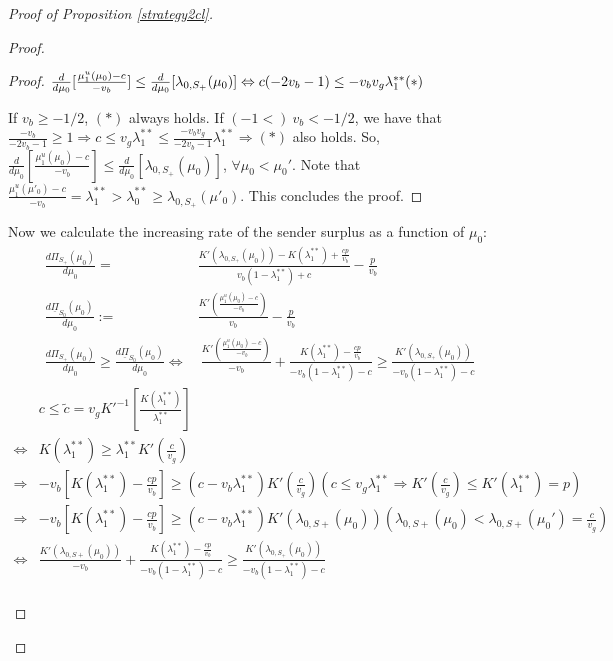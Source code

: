 \documentclass[11pt]{extarticle}
\newcommand{\lra}{\Leftrightarrow}
\newcommand{\ra}{\Rightarrow}
\begin{document}
\begin{proof}[Proof of Proposition \ref{strategy2cl}]
\begin{enumerate}[(1)]
\begin{proof}
\begin{enumerate}[i)]
\begin{proof}
					$\frac{d}{d \mu_0} [\frac{\mu_1^u(\mu_0)-c}{-v_b}] \leq \frac{d}{d \mu_0} [\lambda_{0,S_+}(\mu_0)] \lra c(-2v_b-1)\leq -v_b v_g\lambda_1^{**} \hfill (*)$
					
					If $v_b \geq -1/2$, $(*)$ always holds. If $(-1<) ~v_b < -1/2$, we have that $\frac{-v_b}{-2v_b-1} \geq 1 \ra c \leq v_g\lambda_1^{**}\leq \frac{-v_bv_g}{-2v_b-1}\lambda_1^{**} \ra (*)$ also holds. So, $\frac{d}{d \mu_0} [\frac{\mu_1^u(\mu_0)-c}{-v_b}] \leq \frac{d}{d \mu_0} [\lambda_{0,S_+}(\mu_0)]$, $\forall \mu_0 < \mu_0'$. Note that $\frac{\mu_1^u(\mu'_0)-c}{-v_b} = \lambda_{1}^{**} > \lambda_{0}^{**} \geq \lambda_{0,S_+}(\mu'_0)$. This concludes the proof.
				\end{proof}
				
				Now we calculate the increasing rate of the sender surplus as a function of $\mu_0$:
				\small
				\begin{align*}
				\frac{d \Pi_{S_+}(\mu_0)}{d \mu_0} =&\frac{K'(\lambda_{0,S_+}(\mu_0))-K(\lambda_1^{**})+\frac{cp}{v_b}}{v_b(1-\lambda_1^{**})+c}-\frac{p}{v_b}\\
				\frac{d \underline{\Pi}_{S_0}(\mu_0)}{d \mu_0} :=&\frac{K'(\frac{\mu_1^u(\mu_0)-c}{-v_b})}{v_b} - \frac{p}{v_b}\\
				\frac{d \Pi_{S_+}(\mu_0)}{d \mu_0} \geq \frac{d \underline{\Pi}_{S_0}(\mu_0)}{d \mu_0} \lra&~ \frac{K'(\frac{\mu_1^u(\mu_0)-c}{-v_b})}{-v_b} + \frac{K(\lambda_1^{**})-\frac{cp}{v_b}}{-v_b(1-\lambda_1^{**})-c} \geq \frac{K'(\lambda_{0,S_+}(\mu_0))}{-v_b(1-\lambda_1^{**})-c} \tag{$\star$}\label{bigstar}
				\end{align*}
				\begingroup
				\allowdisplaybreaks
				\begin{align*}
				&c \leq \tilde{c} = v_g K'^{-1}\left[\frac{K(\lambda_1^{**})}{\lambda_1^{**}}\right]\\ 
				\lra&K(\lambda_1^{**}) \geq \lambda_1^{**} K'(\frac{c}{v_g})\\
				\ra& -v_b\left[K(\lambda_1^{**})-\frac{cp}{v_b}\right] \geq (c-v_b \lambda_1^{**}) K'(\frac{c}{v_g})    \left(c\leq v_g \lambda_1^{**} \ra K'(\frac{c}{v_g}) \leq K'(\lambda_1^{**}) = p\right)\\
				\ra& -v_b\left[K(\lambda_1^{**})-\frac{cp}{v_b}\right] \geq (c-v_b \lambda_1^{**}) K'(\lambda_{0,S+}(\mu_0))   \left(\lambda_{0,S+}(\mu_0) < \lambda_{0,S+}(\mu_0') = \frac{c}{v_g}\right)\\
				\lra&\frac{K'(\lambda_{0,S+}(\mu_0))}{-v_b} + \frac{K(\lambda_1^{**})-\frac{cp}{v_b}}{-v_b(1-\lambda_1^{**})-c} \geq \frac{K'(\lambda_{0,S_+}(\mu_0))}{-v_b(1-\lambda_1^{**})-c}\\

\end{align*}
\end{enumerate}
\end{proof}
\end{enumerate}
\end{proof}
\end{document}
